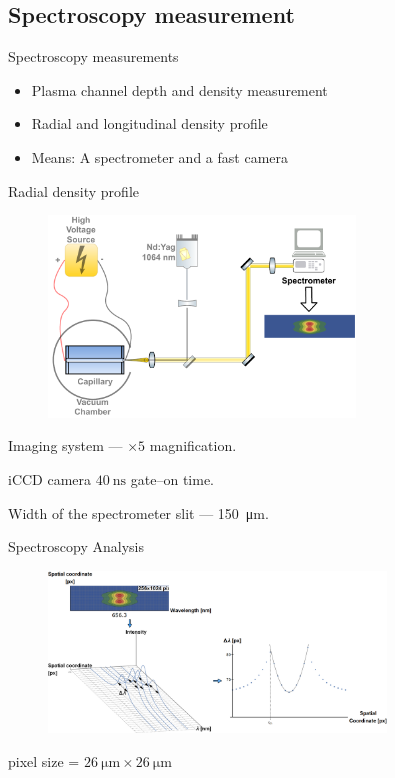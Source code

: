 \documentclass[dvipsnames]{beamer}
\begin{document}
\subsection{Spectroscopy measurement}
\begin{frame}{Spectroscopy measurements}
 \begin{itemize}
  \item Plasma channel depth and density measurement
  \item Radial and longitudinal density profile
  \item Means: A spectrometer and a fast camera
 \end{itemize}
\end{frame}
\begin{frame}{Radial density profile}
 \begin{figure}
\includegraphics[height=152pt]{figures/results/spectro/radial_system.pdf}
 \end{figure}
Imaging system --- $\times 5$ magnification.

iCCD camera $\SI{40}{\ns}$ gate--on time. 

Width of the spectrometer slit --- \SI{150}{\um}.
\end{frame}
\begin{frame}{Spectroscopy Analysis}
\begin{figure}
\includegraphics[width=0.8\textwidth]{figures/results/spectro/spectra_analysis.png}
 \end{figure}
 pixel size = $\SI{26}{\um} \times \SI{26}{\um}$
\end{frame}
\end{document}
